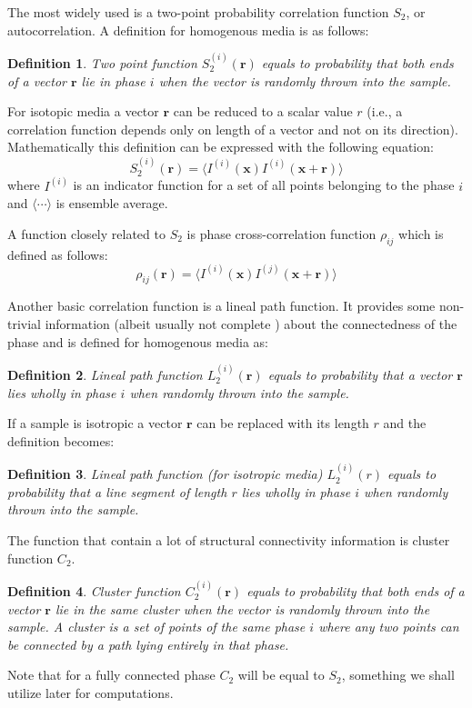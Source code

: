 \documentclass[reprint,amsmath,amssymb,aps,pre,showkeys,showpacs,nofootinbib]{revtex4-1}
\newtheorem{definition}{Definition}
\begin{document}
The most widely used is a two-point probability correlation function $S_2$, or autocorrelation. A
definition for homogenous media is as follows:
\begin{definition}
  Two point function $S_2^{(i)}(\bm{r})$ equals to probability that both ends
  of a vector $\bm{r}$ lie in phase $i$ when the vector is randomly thrown
  into the sample.
\end{definition}
For isotopic media a vector $\bm{r}$ can be reduced to a scalar value
$r$ (i.e., a correlation function depends only on length of a vector and not on
its direction). Mathematically this definition can be expressed with the
following equation:
\begin{equation}
  S_2^{(i)}(\bm{r}) = \langle I^{(i)}(\bm{x}) I^{(i)}(\bm{x} +
  \bm{r}) \rangle
  \label{eq:s2-def}
\end{equation}
where $I^{(i)}$ is an indicator function for a set of all points belonging to
the phase $i$ and $\langle \cdots \rangle$ is ensemble average.

A function closely related to $S_2$ is phase cross-correlation function
$\rho_{ij}$ which is defined as follows:
\begin{equation}
  \rho_{ij}(\bm{r}) = \langle I^{(i)}(\bm{x}) I^{(j)}(\bm{x} +
  \bm{r}) \rangle
  \label{eq:cross-def}
\end{equation}

Another basic correlation function is a lineal path function. It provides some non-trivial
information (albeit usually not complete \cite{vcapek2011transport}) about the connectedness
of the phase and is defined for homogenous media as:
\begin{definition}
  Lineal path function $L_2^{(i)}(\bm{r})$ equals to probability that a
  vector $\bm{r}$ lies wholly in phase $i$ when randomly thrown into the
  sample.
\end{definition}
If a sample is isotropic a vector $\bm{r}$ can be replaced with its length
$r$ and the definition becomes:
\begin{definition}
  Lineal path function (for isotropic media) $L_2^{(i)}(r)$ equals to
  probability that a line segment of length $r$ lies wholly in phase $i$ when
  randomly thrown into the sample.
\end{definition}

The function that contain a lot of structural connectivity information \cite{JiaoPNAS}
is cluster function $C_2$.
\begin{definition}
  Cluster function $C_2^{(i)}(\bm{r})$ equals to probability that both
  ends of a vector $\bm{r}$ lie in the same cluster when the vector is
  randomly thrown into the sample. A cluster is a set of points of the same
  phase $i$ where any two points can be connected by a path lying entirely in
  that phase.
\end{definition}
Note that for a fully connected phase $C_2$ will be equal to $S_2$, something
we shall utilize later for computations.
\end{document}
